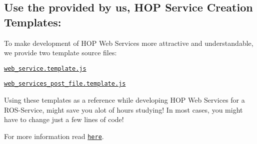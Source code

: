 \subsection*{Use the provided by us, H\-O\-P Service Creation Templates\-:}

To make development of H\-O\-P Web Services more attractive and understandable, we provide two template source files\-:


\begin{DoxyItemize}
\item \href{https://github.com/rapp-project/rapp-platform/tree/master/rapp_web_services/services/templates/web_service.template.js}{\tt web\-\_\-service.\-template.\-js}
\item \href{https://github.com/rapp-project/rapp-platform/blob/master/rapp_web_services/services/templates/web_service_post_file.template.js}{\tt web\-\_\-services\-\_\-post\-\_\-file.\-template.\-js}
\end{DoxyItemize}

Using these templates as a reference while developing H\-O\-P Web Services for a R\-O\-S-\/\-Service, might save you alot of hours studying! In most cases, you might have to change just a few lines of code!

For more information read \href{https://github.com/rapp-project/rapp-platform/tree/master/rapp_web_services/services/templates}{\tt here}. 
